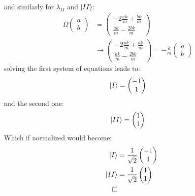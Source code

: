 \documentclass[10pt,twocoloumn]{article}
\begin{document}
and similarly for $\lambda_{II}$ and $\left| II \right\rangle$:
\begin{align}
    \Omega \begin{pmatrix} a \\ b \end{pmatrix} &= \begin{pmatrix} -2\frac{ak}{m} + \frac{bk}{m} \\ \frac{ak}{m} -\frac{2bk}{m}\end{pmatrix}\\
    &\rightarrow \begin{pmatrix} -2\frac{ak}{m} + \frac{bk}{m} \\ \frac{ak}{m} -\frac{2bk}{m}\end{pmatrix} = -\frac{k}{m} \begin{pmatrix} a \\ b \end{pmatrix}
\end{align}
solving the first system of equations leads to:
\begin{equation}
    \left| I \right\rangle = \begin{pmatrix}-1\\ 1\end{pmatrix}
\end{equation}
and the second one:
\begin{equation}
    \left| II \right\rangle = \begin{pmatrix} 1 \\ 1 \end{pmatrix}
\end{equation}
Which if normalized would become:
\begin{align}
    \left| I \right\rangle &= \frac{1}{\sqrt2}\begin{pmatrix}-1 \\ 1 \end{pmatrix}\\
    \left| II \right\rangle &= \frac{1}{\sqrt2}\begin{pmatrix}1 \\ 1 \end{pmatrix} \\ \qed
\end{align}
\end{document}
